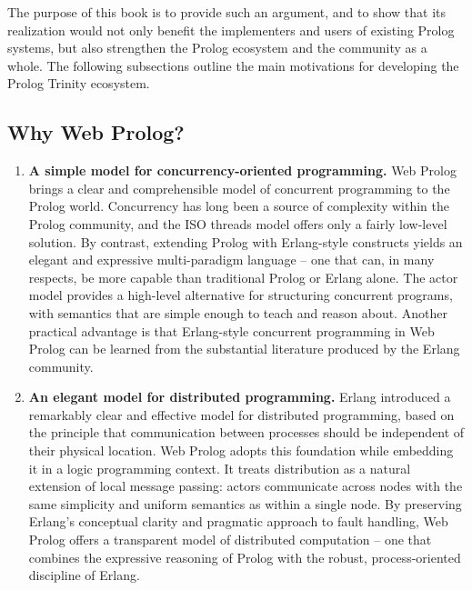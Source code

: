 The purpose of this book is to provide such an argument, and to show that its realization would not only benefit the implementers and users of existing Prolog systems, but also strengthen the Prolog ecosystem and the community as a whole. The following subsections outline the main motivations for developing the Prolog Trinity ecosystem.


\subsection{Why Web Prolog?}\label{sec:why-web-prolog}

\begin{enumerate}

\item \textbf{A simple model for concurrency-oriented programming.}
Web Prolog brings a clear and comprehensible model of concurrent programming to the Prolog world. Concurrency has long been a source of complexity within the Prolog community, and the ISO threads model offers only a fairly low-level solution. By contrast, extending Prolog with Erlang-style constructs yields an elegant and expressive multi-paradigm language -- one that can, in many respects, be more capable than traditional Prolog or Erlang alone. The actor model provides a high-level alternative for structuring concurrent programs, with semantics that are simple enough to teach and reason about. Another practical advantage is that Erlang-style concurrent programming in Web Prolog can be learned from the substantial literature produced by the Erlang community.

\item \textbf{An elegant model for distributed programming.}
Erlang introduced a remarkably clear and effective model for distributed programming, based on the principle that communication between processes should be independent of their physical location. Web Prolog adopts this foundation while embedding it in a logic programming context. It treats distribution as a natural extension of local message passing: actors communicate across nodes with the same simplicity and uniform semantics as within a single node. By preserving Erlang's conceptual clarity and pragmatic approach to fault handling, Web Prolog offers a transparent model of distributed computation -- one that combines the expressive reasoning of Prolog with the robust, process-oriented discipline of Erlang.


\end{enumerate}
